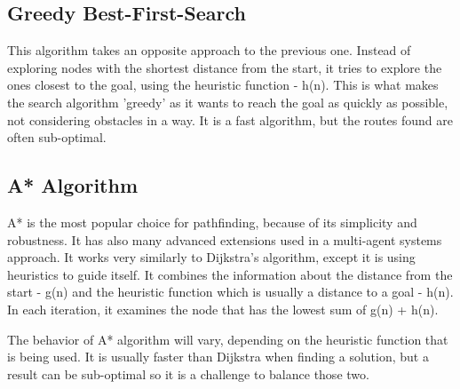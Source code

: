 \subsection{Greedy Best-First-Search}
This algorithm takes an opposite approach to the previous one. Instead of exploring nodes with the shortest distance from the start, it tries to explore the ones closest to the goal, using the heuristic function - h(n). This is what makes the search algorithm 'greedy' as it wants to reach the goal as quickly as possible, not considering obstacles in a way. It is a fast algorithm, but the routes found are often sub-optimal.

\subsection{A* Algorithm}
A* is the most popular choice for pathfinding, because of its simplicity and robustness. It has also many advanced extensions used in a multi-agent systems approach. It works very similarly to Dijkstra's algorithm, except it is using heuristics to guide itself. It combines the information about the distance from the start - g(n) and the heuristic function which is usually a distance to a goal - h(n). In each iteration, it examines the node that has the lowest sum of g(n) + h(n)\cite{basic_2}.

The behavior of A* algorithm will vary, depending on the heuristic function that is being used. It is usually faster than Dijkstra when finding a solution, but a result can be sub-optimal so it is a challenge to balance those two.
